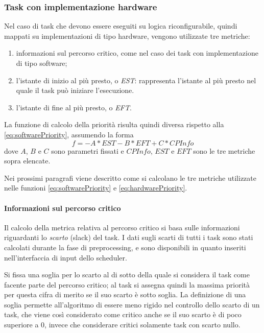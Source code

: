 \subsubsection{Task con implementazione hardware}
Nel caso di task che devono essere eseguiti su logica riconfigurabile, quindi 
mappati su implementazioni di tipo hardware, vengono utilizzate tre metriche:
\begin{enumerate}
 \item informazioni sul percorso critico, come nel caso dei task con 
implementazione di tipo software;
 \item l'istante di inizio al più presto, o \emph{\ac{EST}}: rappresenta 
l'istante al più presto nel quale il task può iniziare l'esecuzione.
 \item l'istante di fine al più presto, o \emph{\ac{EFT}}.
\end{enumerate}
La funzione di calcolo della priorità risulta quindi diversa rispetto alla 
\ref{eq:softwarePriority}, assumendo la forma
\begin{equation} \label{eq:hardwarePriority}
 f=-A*EST - B*EFT + C*CPInfo
\end{equation}
dove $A$, $B$ e $C$ sono parametri fissati e $CPInfo$, $EST$ e $EFT$ sono le 
tre metriche sopra elencate.

Nei prossimi paragrafi viene descritto come si calcolano le tre metriche 
utilizzate nelle funzioni \ref{eq:softwarePriority} e \ref{eq:hardwarePriority}.

\paragraph{Informazioni sul percorso critico}
Il calcolo della metrica relativa al percorso critico si basa sulle 
informazioni riguardanti lo \emph{scarto} (slack) del task. I dati sugli 
scarti di tutti i task sono stati calcolati durante la fase di preprocessing, 
e sono disponibili in quanto inseriti nell'interfaccia di input dello scheduler.

Si fissa una soglia per lo scarto al di sotto della quale si considera il task 
come facente parte del percorso critico; al task si assegna quindi la massima 
priorità per questa cifra di merito se il suo scarto è sotto soglia. La 
definizione di una soglia permette all'algoritmo di essere meno rigido nel 
controllo dello scarto di un task, che viene così considerato come critico anche 
se il suo scarto è di poco superiore a $0$, invece che considerare critici 
solamente task con scarto nullo.

